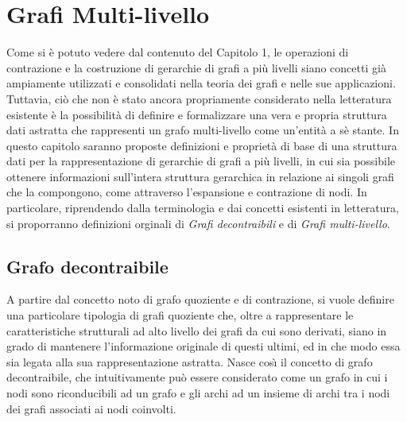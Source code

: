 \chapter{Grafi Multi-livello}\label{cap:grafi-multi-livello}

Come si \`e potuto vedere dal contenuto del Capitolo 1, le operazioni di contrazione e la costruzione di
gerarchie di grafi a pi\`u livelli siano concetti gi\`a ampiamente utilizzati e consolidati nella teoria dei grafi e
nelle sue applicazioni.
Tuttavia, ci\`o che non \`e stato ancora propriamente considerato nella letteratura esistente \`e la possibilit\`a di
definire e formalizzare una vera e propria struttura dati astratta che rappresenti un grafo multi-livello come
un'entit\`a a s\`e stante.
In questo capitolo saranno proposte definizioni e propriet\`a di base di una struttura dati per la rappresentazione
di gerarchie di grafi a pi\`u livelli, in cui sia possibile ottenere informazioni sull'intera struttura gerarchica in
relazione ai singoli grafi che la compongono, come attraverso l'espansione e contrazione di nodi.
In particolare, riprendendo dalla terminologia e dai concetti esistenti in letteratura, si proporranno definizioni
orginali di \textit{Grafi decontraibili} e di \textit{Grafi multi-livello}.

\section{Grafo decontraibile}\label{subsec:grafo-decontraibile}

    A partire dal concetto noto di grafo quoziente e di contrazione, si vuole definire una particolare
    tipologia di grafi quoziente che, oltre a rappresentare le caratteristiche strutturali ad alto livello
    dei grafi da cui sono derivati, siano in grado di mantenere l'informazione originale di questi ultimi, ed in
    che modo essa sia legata alla sua rappresentazione astratta. \newline
    Nasce cos\`{\i} il concetto di grafo decontraibile, che intuitivamente pu\`o essere considerato come un grafo
    in cui i nodi sono riconducibili ad un grafo e gli archi ad un insieme di archi tra i nodi dei grafi
    associati ai nodi coinvolti. \newline

